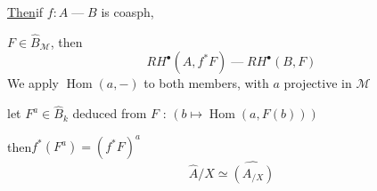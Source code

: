 \quad\uline{Then}\qquad if $f:A\mathbin{\text{---}}B$ is coasph,

$F\in\widehat B_{\mathcal M}$, then
\[
RH^\bullet(A,f^*F)\mathbin{\text{---}}RH^\bullet(B,F)
\]
We apply $\operatorname{Hom}(a,-)$ to both members,
with $a$ projective in $\mathcal M$

 let $F^a\in\widehat B_k$ deduced from $F$ :
$(b\longmapsto\operatorname{Hom}(a,F(b)))$

then\qquad $f^*(F^a)=(f^*F)^a$
\[
\widehat A/X\simeq\widehat{(A_{/X})}
\]

